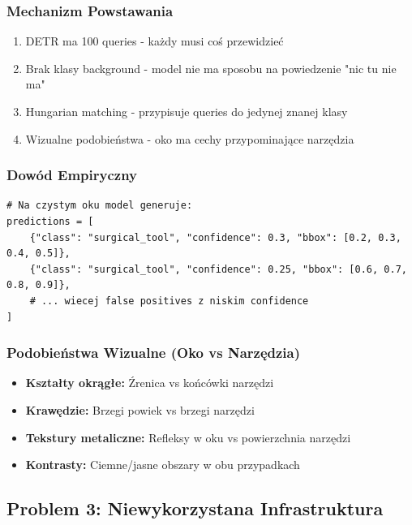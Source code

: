 \documentclass[12pt,a4paper]{article}
\begin{document}
\subsubsection{Mechanizm Powstawania}

\begin{enumerate}
    \item DETR ma 100 queries - każdy musi coś przewidzieć
    \item Brak klasy background - model nie ma sposobu na powiedzenie "nic tu nie ma"
    \item Hungarian matching - przypisuje queries do jedynej znanej klasy
    \item Wizualne podobieństwa - oko ma cechy przypominające narzędzia
\end{enumerate}

\subsubsection{Dowód Empiryczny}

\begin{lstlisting}[caption={Predykcje na czystym oku},label={lst:false_positives}]
# Na czystym oku model generuje:
predictions = [
    {"class": "surgical_tool", "confidence": 0.3, "bbox": [0.2, 0.3, 0.4, 0.5]},
    {"class": "surgical_tool", "confidence": 0.25, "bbox": [0.6, 0.7, 0.8, 0.9]},
    # ... wiecej false positives z niskim confidence
]
\end{lstlisting}

\subsubsection{Podobieństwa Wizualne (Oko vs Narzędzia)}

\begin{itemize}
    \item \textbf{Kształty okrągłe:} Źrenica vs końcówki narzędzi
    \item \textbf{Krawędzie:} Brzegi powiek vs brzegi narzędzi
    \item \textbf{Tekstury metaliczne:} Refleksy w oku vs powierzchnia narzędzi
    \item \textbf{Kontrasty:} Ciemne/jasne obszary w obu przypadkach
\end{itemize}

\subsection{Problem 3: Niewykorzystana Infrastruktura}
\end{document}
